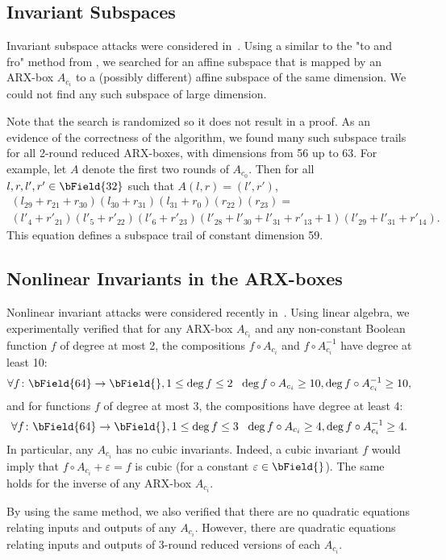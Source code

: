 
\subsection{Invariant Subspaces}

Invariant subspace attacks were considered in~\cite{InvSpacePrint}.
Using a similar to the "to and fro" method from \cite{LinAffEQold,LinAffEQ}, we searched for an affine subspace that is mapped by an ARX-box $A_{c_i}$ to a (possibly different) affine subspace of the same dimension. We could not find any such subspace of large dimension.

Note that the search is randomized so it does not result in a proof. As an evidence of the correctness of the algorithm, we found many such subspace trails for all 2-round reduced ARX-boxes, with dimensions from 56 up to 63. For example, let $A$ denote the first two rounds of $A_{c_0}$. Then for all $l,r,l',r' \in \bField{32}$ such that $A(l, r) = (l', r')$,
\begin{multline*}
(l_{29} + r_{21} + r_{30}) (l_{30} + r_{31}) (l_{31} + r_{0}) (r_{22}) (r_{23}) = \\
(l'_{4} + r'_{21}) (l'_{5} + r'_{22}) (l'_{6} + r'_{23}) (l'_{28} + l'_{30} + l'_{31} + r'_{13} + 1) (l'_{29} + l'_{31} + r'_{14}).
\end{multline*}
This equation defines a subspace trail of constant dimension 59.


\subsection{Nonlinear Invariants in the ARX-boxes}
Nonlinear invariant attacks were considered recently in~\cite{NonlinInv}.
Using linear algebra, we experimentally verified that for any ARX-box $A_{c_i}$ and any non-constant Boolean function $f$ of degree at most 2, the compositions $f \circ A_{c_i}$ and $f \circ A_{c_i}^{-1}$ have degree at least 10:
$$
\forall f\colon \bField{64} \to \bField{}, 1 \le \deg{f} \le 2 ~~ \deg{f \circ A_{c_i}} \ge 10, \deg{f \circ A_{c_i}^{-1}} \ge 10,
$$
and for functions $f$ of degree at most 3, the compositions have degree at least 4:
$$
\forall f\colon \bField{64} \to \bField{}, 1 \le \deg{f} \le 3 ~~ \deg{f \circ A_{c_i}} \ge 4, \deg{f \circ A_{c_i}^{-1}} \ge 4.
$$
In particular, any $A_{c_i}$ has no cubic invariants. Indeed, a cubic invariant $f$ would imply that $f \circ A_{c_i} + \varepsilon = f$ is cubic (for a constant $\varepsilon \in \bField{}$). The same holds for the inverse of any ARX-box $A_{c_i}$.

By using the same method, we also verified that there are no quadratic equations relating inputs and outputs of any $A_{c_i}$. However, there are quadratic equations relating inputs and outputs of 3-round reduced versions of each $A_{c_i}$.

